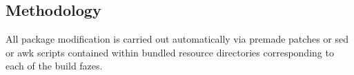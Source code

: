 \subsection{Methodology}\label{Methodology}

All package modification is carried out automatically via premade patches or sed or awk scripts contained within bundled resource directories corresponding to each of the build fazes.
